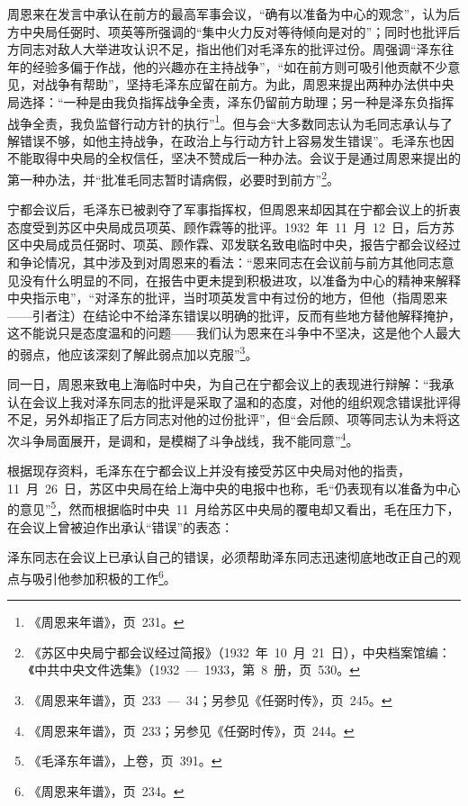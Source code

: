 周恩来在发言中承认在前方的最高军事会议，“确有以准备为中心的观念”，认为后方中央局任弼时、项英等所强调的“集中火力反对等待倾向是对的”；同时也批评后方同志对敌人大举进攻认识不足，指出他们对毛泽东的批评过份。周强调“泽东往年的经验多偏于作战，他的兴趣亦在主持战争”，“如在前方则可吸引他贡献不少意见，对战争有帮助”，坚持毛泽东应留在前方。为此，周恩来提出两种办法供中央局选择：“一种是由我负指挥战争全责，泽东仍留前方助理；另一种是泽东负指挥战争全责，我负监督行动方针的执行”\footnote{《周恩来年谱》，页~231。}。但与会“大多数同志认为毛同志承认与了解错误不够，如他主持战争，在政治上与行动方针上容易发生错误”。毛泽东也因不能取得中央局的全权信任，坚决不赞成后一种办法。会议于是通过周恩来提出的第一种办法，并“批准毛同志暂时请病假，必要时到前方”\footnote{《苏区中央局宁都会议经过简报》（1932~年~10~月~21~日），中央档案馆编：《中共中央文件选集》（1932~—~1933，第~8~册，页~530。}。

宁都会议后，毛泽东已被剥夺了军事指挥权，但周恩来却因其在宁都会议上的折衷态度受到苏区中央局成员项英、顾作霖等的批评。1932~年~11~月~12~日，后方苏区中央局成员任弼时、项英、顾作霖、邓发联名致电临时中央，报告宁都会议经过和争论情况，其中涉及到对周恩来的看法：“恩来同志在会议前与前方其他同志意见没有什么明显的不同，在报告中更未提到积极进攻，以准备为中心的精神来解释中央指示电”，“对泽东的批评，当时项英发言中有过份的地方，但他（指周恩来——引者注）在结论中不给泽东错误以明确的批评，反而有些地方替他解释掩护，这不能说只是态度温和的问题——我们认为恩来在斗争中不坚决，这是他个人最大的弱点，他应该深刻了解此弱点加以克服”\footnote{《周恩来年谱》，页~233~—~34；另参见《任弼时传》，页~245。}。

同一日，周恩来致电上海临时中央，为自己在宁都会议上的表现进行辩解：“我承认在会议上我对泽东同志的批评是采取了温和的态度，对他的组织观念错误批评得不足，另外却指正了后方同志对他的过份批评”，但“会后顾、项等同志认为未将这次斗争局面展开，是调和，是模糊了斗争战线，我不能同意”\footnote{《周恩来年谱》，页~233；另参见《任弼时传》，页~244。}。

根据现存资料，毛泽东在宁都会议上并没有接受苏区中央局对他的指责，11~月~26~日，苏区中央局在给上海中央的电报中也称，毛“仍表现有以准备为中心的意见”\footnote{《毛泽东年谱》，上卷，页~391。}，然而根据临时中央~11~月给苏区中央局的覆电却又看出，毛在压力下，在会议上曾被迫作出承认“错误”的表态：

\begin{quoting}
泽东同志在会议上已承认自己的错误，必须帮助泽东同志迅速彻底地改正自己的观点与吸引他参加积极的工作\footnote{《周恩来年谱》，页~234。}。
\end{quoting}

